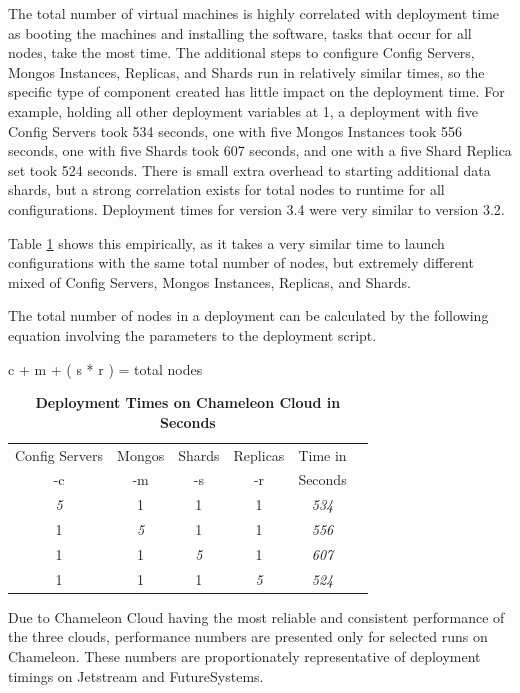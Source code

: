 \documentclass[9pt,twocolumn,twoside]{../../styles/osajnl}
\begin{document}
The total number of virtual machines is highly correlated with
deployment time as booting the machines and installing the software,
tasks that occur for all nodes, take the most time. The additional
steps to configure Config Servers, Mongos Instances, Replicas, and
Shards run in relatively similar times, so the specific type of
component created has little impact on the deployment time. For
example, holding all other deployment variables at 1, a deployment
with five Config Servers took 534 seconds, one with five Mongos
Instances took 556 seconds, one with five Shards took 607 seconds, and
one with a five Shard Replica set took 524 seconds. There is small
extra overhead to starting additional data shards, but a strong
correlation exists for total nodes to runtime for all configurations.
Deployment times for version 3.4 were very similar to version 3.2.

Table \ref{tab:deploy-times2} shows this empirically, as it takes a
very similar time to launch configurations with the same total number
of nodes, but extremely different mixed of Config Servers, Mongos
Instances, Replicas, and Shards.

The total number of nodes in a deployment can be calculated by the
following equation involving the parameters to the deployment script.

c + m + ( s * r ) = total nodes

\begin{table}[htbp]
\centering
\caption{\bf Deployment Times on Chameleon Cloud in Seconds}

 \begin{tabular}{| c | c | c | c | c | c |} 
 \hline
Config Servers &  Mongos & Shards & Replicas & Time in \\
-c &  -m & -s & -r & Seconds
\\ [0.5ex] 
 \hline
 \hline
\emph{5} & 1 & 1 & 1 & \emph{534} \\
 \hline
 1 & \emph{5}  & 1 & 1 & \emph{556} \\
 \hline
 1 & 1 & \emph{5} & 1 & \emph{607} \\
 \hline
 1 & 1 & 1 & \emph{5}  & \emph{524}  \\ [1ex] 
 \hline
\end{tabular}
  \label{tab:deploy-times2}
\end{table}

Due to Chameleon Cloud having the most reliable and consistent
performance of the three clouds, performance numbers are presented
only for selected runs on Chameleon. These numbers are proportionately
representative of deployment timings on Jetstream and FutureSystems.
\end{document}
